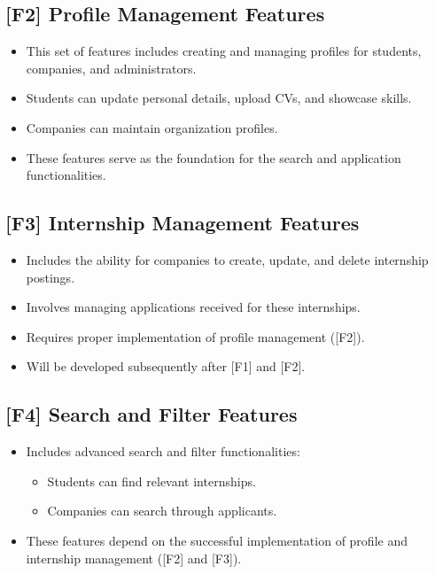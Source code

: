 \subsection{[F2] Profile Management Features}
\begin{itemize}
    \item This set of features includes creating and managing profiles for students, companies, and administrators.
    \item Students can update personal details, upload CVs, and showcase skills.
    \item Companies can maintain organization profiles.
    \item These features serve as the foundation for the search and application functionalities.
\end{itemize}

\subsection{[F3] Internship Management Features}
\begin{itemize}
    \item Includes the ability for companies to create, update, and delete internship postings.
    \item Involves managing applications received for these internships.
    \item Requires proper implementation of profile management ([F2]).
    \item Will be developed subsequently after [F1] and [F2].
\end{itemize}

\subsection{[F4] Search and Filter Features}
\begin{itemize}
    \item Includes advanced search and filter functionalities:
    \begin{itemize}
        \item Students can find relevant internships.
        \item Companies can search through applicants.
    \end{itemize}
    \item These features depend on the successful implementation of profile and internship management ([F2] and [F3]).
\end{itemize}

